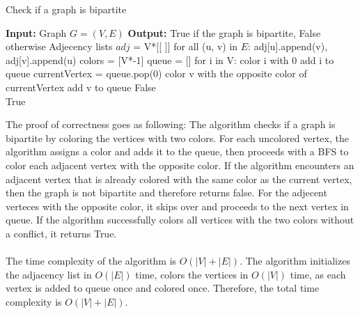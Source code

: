 \documentclass[10pt]{article}
\begin{document}
\begin{solution}
\begin{enumerate}[(a)]
        \begin{algorithm}
            \caption{Check if a graph is bipartite} 
            \begin{algorithmic}[1]
            \Statex \textbf{Input:} Graph $G=(V,E)$
            \Statex \textbf{Output:} True if the graph is bipartite, False otherwise
            \State Adjecency lists $adj$ = V*[[ ]]
            \State for all (u, v) in $E$: adj[u].append(v), adj[v].append(u)
            \State colors = [V*-1]
            \State queue = []
            \State for i in V: 
                    \State  color i with 0
                    \State add i to queue
                        \State currentVertex = queue.pop(0)
                                \State color v with the opposite color of currentVertex
                                \State add v to queue
                                \State \Return False
                            \EndIf
                        \EndFor
                    \EndWhile
                \EndIf \\
            \Return True
            \end{algorithmic}
        \end{algorithm}
    \end{enumerate}
    The proof of correctness goes as following: The algorithm checks if a graph is bipartite by coloring the vertices with two colors. For each uncolored vertex, the algorithm assigns a color and adds it to the queue, then proceeds with a BFS to color each adjacent vertex
    with the opposite color. If the algorithm encounters an adjacent vertex that is already colored with the same color as the current vertex, then the graph is not bipartite and therefore returns false. For the adjecent verteces with the opposite color, it skips over and proceeds to the next vertex in queue.
    If the algorithm successfully colors all vertices with the two colors without a conflict, it returns True.
    \\ \\
    The time complexity of the algorithm is $O(|V|+|E|)$. The algorithm initializes the adjacency list in $O(|E|)$ time, colors the vertices in $O(|V|)$ time, as each vertex is added to queue once and colored once. Therefore, the total time complexity is $O(|V|+|E|)$.
\end{solution}
\newpage
\end{document}
